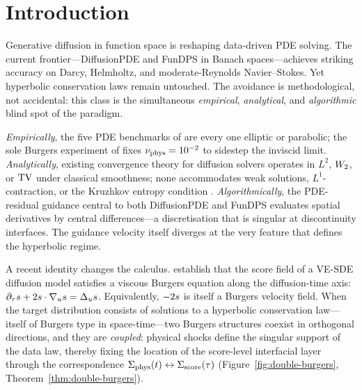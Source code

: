 %
%
\section{Introduction}
\label{sec:intro}

Generative diffusion in function space is reshaping data-driven {PDE} solving. The current frontier---{DiffusionPDE} \citep{huang2024diffusionpde} and {FunDPS} \citep{yao2025fundps} in Banach spaces---achieves striking accuracy on Darcy, Helmholtz, and moderate-Reynolds Navier--Stokes. Yet hyperbolic conservation laws remain untouched. The avoidance is methodological, not accidental: this class is the simultaneous \emph{empirical}, \emph{analytical}, and \emph{algorithmic} blind spot of the paradigm.

\textit{Empirically}, the five {PDE} benchmarks of \citet{yao2025fundps} are every one elliptic or parabolic; the sole Burgers experiment of \citet{huang2024diffusionpde} fixes $\nu_{\mathrm{phys}} = 10^{-2}$ to sidestep the inviscid limit. \textit{Analytically}, existing convergence theory for diffusion solvers operates in $L^{2}$, $W_{2}$, or $\mathrm{TV}$ under classical smoothness; none accommodates weak solutions, $L^{1}$-contraction, or the Kruzhkov entropy condition \citep{kruzhkov1970}. \textit{Algorithmically}, the {PDE}-residual guidance central to both {DiffusionPDE} and {FunDPS} evaluates spatial derivatives by central differences---a discretisation that is singular at discontinuity interfaces. The guidance velocity itself diverges at the very feature that defines the hyperbolic regime.

A recent identity changes the calculus. \citet{sarkar2026scoreshocks} establish that the score field of a {VE-SDE} diffusion model satisfies a viscous Burgers equation along the diffusion-time axis: $\partial_{\tau} s + 2s\cdot\nabla_{u}s = \Delta_{u}s$. Equivalently, $-2s$ is itself a Burgers velocity field. When the target distribution consists of solutions to a hyperbolic conservation law---itself of Burgers type in space-time---two Burgers structures coexist in orthogonal directions, and they are \emph{coupled}: physical shocks define the singular support of the data law, thereby fixing the location of the score-level interfacial layer through the correspondence $\Sigma_{\mathrm{phys}}(t) \leftrightarrow \Sigma_{\mathrm{score}}(\tau)$ (Figure~\ref{fig:double-burgers}, Theorem~\ref{thm:double-burgers}).

